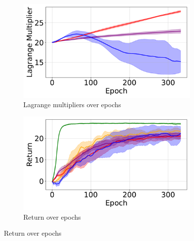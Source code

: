 \begin{figure}[H]
\begin{minipage}{0.48\textwidth}
        \begin{subfigure}{\linewidth}
            \centering
            \includegraphics[width=\linewidth]{figure/PointGoal/limit 1.5/lagrange.pdf}
            \caption{Lagrange multipliers over epochs}
        \end{subfigure}

        \caption*{Cost return limit: 1.5}
    \end{minipage}
    \hfill
    \begin{minipage}{0.48\textwidth}
        \centering
        \begin{subfigure}{\linewidth}
            \centering
            \includegraphics[width=\linewidth]{figure/PointGoal/limit 2/EpRet.pdf}
            \caption{Return over epochs}
        \end{subfigure}


\end{minipage}
\end{figure}

